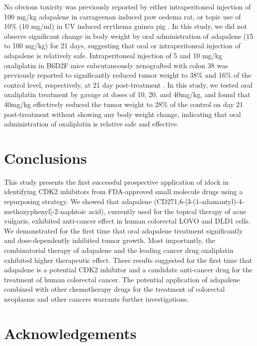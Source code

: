 \documentclass[10pt]{article}
\begin{document}
No obvious toxicity was previously reported by either intraperitoneal injection of 100 mg/kg adapalene in carrageenan induced paw oedema rat, or topic use of 10\% (10 mg/ml) in UV induced erythema guinea pig \citep{1604}. In this study, we did not observe significant change in body weight by oral administration of adapalene (15 to 100 mg/kg) for 21 days, suggesting that oral or intraperitoneal injection of adapalene is relatively safe. Intraperitoneal injection of 5 and 10 mg/kg oxaliplatin in B6D2F mice subcutaneously xenografted with colon 38 was previously reported to significantly reduced tumor weight to 38\% and 16\% of the control level, respectively, at 21 day post-treatment \citep{1605}. In this study, we tested oral oxaliplatin treatment by gavage at doses of 10, 20, and 40mg/kg, and found that 40mg/kg effectively reduced the tumor weight to 28\% of the control on day 21 post-treatment without showing any body weight change, indicating that oral administration of oxaliplatin is relative safe and effective.

\section*{Conclusions}

This study presents the first successful prospective application of idock \citep{1153,1362} in identifying CDK2 inhibitors from FDA-approved small molecule drugs using a repurposing strategy. We showed that adapalene (CD271,6-[3-(1-adamantyl)-4-methoxyphenyl]-2-naphtoic acid), currently used for the topical therapy of acne vulgaris, exhibited anti-cancer effect in human colorectal LOVO and DLD1 cells. We demonstrated for the first time that oral adapalene treatment significantly and dose-dependently inhibited tumor growth. Most importantly, the combinatorial therapy of adapalene and the leading cancer drug oxaliplatin exhibited higher therapeutic effect. These results suggested for the first time that adapalene is a potential CDK2 inhibitor and a candidate anti-cancer drug for the treatment of human colorectal cancer. The potential application of adapalene combined with other chemotherapy drugs for the treatment of colorectal neoplasms and other cancers warrants further investigations.

\section*{Acknowledgements}
\end{document}
